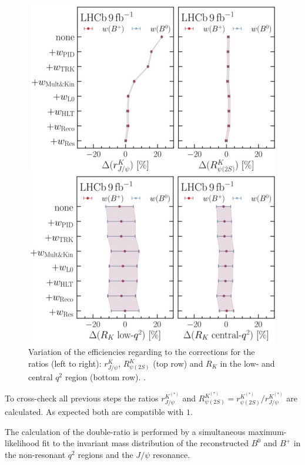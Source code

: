 \begin{figure}
    \centering
    \includegraphics[width=0.84\linewidth]{figures/weights_cut.png}
    \caption{Variation of the efficiencies regarding to the corrections for the ratios (left to right):
    $r^{K}_{J\!/\!\psi}$, $R^{K}_{\psi(2S)}$ (top row) and $R_{K}$ in the low- and central $q^2$ region (bottom row).
    \cite{lhcbcollaboration2022test}.}
    \label{fig:weights}
\end{figure}
To cross-check all previous steps the ratios $r^{K^{(*)}}_{J\!/\!\psi}$ and 
${R^{K^{(*)}}_{\psi(2S)}=r^{K^{(*)}}_{\psi(2S)}/r^{K^{(*)}}_{J\!/\!\psi}}$ 
are calculated. As expected both are compatible with $\num{1}$.

The calculation of the double-ratio is performed by a simultaneous maximum-likelihood 
fit to the invariant mass distribution of the reconstructed $B^0$ and $B^+$ in the 
non-resonant $q^2$ regions and the $J\!/\!\psi$ resonance. 

